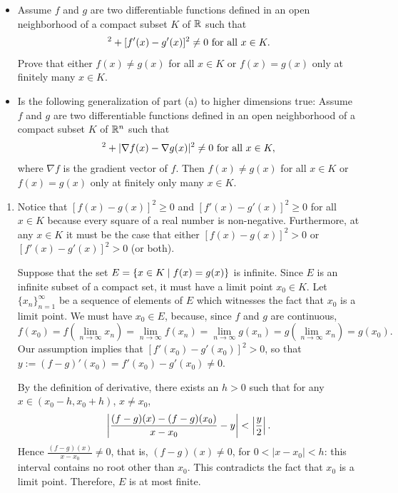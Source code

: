 \begin{problem}
\begin{itemize}
    \item[(a)] Assume $f$ and $g$ are two differentiable functions defined in an open neighborhood of a compact subset $K$ of $\mathbb{R}$ such that 
    \begin{align*}
        [f(x) - g(x)]^2 + [f'(x) - g'(x)]^2 \ne 0 \fall{x}{K}.
    \end{align*}
    Prove that either $f(x) \ne g(x)$ for all $x \in K$ or $f(x) = g(x)$ only at finitely many $x \in K$.
    \item[(b)] Is the following generalization of part (a) to higher dimensions true: 
    Assume $f$ and $g$ are two differentiable functions defined in an open neighborhood of a compact subset $K$ of $\mathbb{R}^n$ such that
    \begin{align*}
        [f(x) - g(x)]^2 + |\nabla f(x) - \nabla g(x)|^2 \ne 0 \fall{x}{K},
    \end{align*}
    where $\nabla f$ is the gradient vector of $f$. Then $f(x) \ne g(x)$ for all $x \in K$ or $f(x) = g(x)$ only at finitely only many $x \in K$.
\end{itemize}
\begin{solution}
\begin{enumerate}
    \item[(a)] Notice that $[f(x) - g(x)]^2 \geq 0$ and $[f'(x) - g'(x)]^2 \geq 0$ for all $x \in K$ because every square of a real number is non-negative. Furthermore, at any $x \in K$ it must be the case that either $[f(x) - g(x)]^2 > 0$ or $[f'(x) - g'(x)]^2 > 0$ (or both).
    
    Suppose that the set $E = \left\{ x \in K \mid f(x) = g(x)\right\}$ is infinite. Since $E$ is an infinite subset of a compact set, it must have a limit point $x_0 \in K$. Let $\{x_n\}_{n=1}^\infty$ be a sequence of elements of $E$ which witnesses the fact that $x_0$ is a limit point. We must have $x_0 \in E$, because, since $f$ and $g$ are continuous,
    $$ f(x_0) = f(\lim_{n \to \infty} x_n) = \lim_{n \to \infty} f(x_n) = \lim_{n \to \infty} g(x_n) = g(\lim_{n \to \infty} x_n) = g(x_0). $$
    Our assumption implies that $[f'(x_0) - g'(x_0)]^2 > 0$, so that $y := (f - g)'(x_0) = f'(x_0) - g'(x_0) \neq 0$.
    
    By the definition of derivative, there exists an $h > 0$ such that for any $x \in (x_0 - h, x_0 + h)$, $x\neq x_0$,
    $$ \left\lvert \frac{(f - g)(x) - (f - g)(x_0)}{x - x_0} - y\right\rvert < \left\lvert \frac{y}{2}\right\rvert. $$
    Hence $\frac{(f-g)(x)}{x-x_0}\neq 0$, that is, $(f-g)(x)\neq 0$, for $0<|x-x_0|<h$: this interval contains no root other than $x_0$. This contradicts the fact that $x_0$ is a limit point. Therefore, $E$ is at most finite.
    

\end{enumerate}
\end{solution}
\end{problem}
